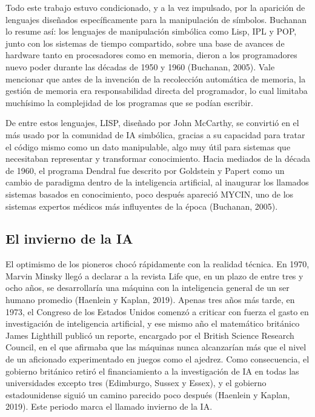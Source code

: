 \documentclass[12pt,letterpaper]{article}
\begin{document}
Todo este trabajo estuvo condicionado, y a la vez impulsado, por la aparici\'on de lenguajes dise\~nados espec\'ificamente para la manipulaci\'on de s\'imbolos. Buchanan lo resume as\'i: los lenguajes de manipulaci\'on simb\'olica como Lisp, IPL y POP, junto con los sistemas de tiempo compartido, sobre una base de avances de hardware tanto en procesadores como en memoria, dieron a los programadores nuevo poder durante las d\'ecadas de 1950 y 1960 (Buchanan, 2005). Vale mencionar que antes de la invenci\'on de la recolecci\'on autom\'atica de memoria, la gesti\'on de memoria era responsabilidad directa del programador, lo cual limitaba much\'isimo la complejidad de los programas que se pod\'ian escribir.

De entre estos lenguajes, LISP, dise\~nado por John McCarthy, se convirti\'o en el m\'as usado por la comunidad de IA simb\'olica, gracias a su capacidad para tratar el c\'odigo mismo como un dato manipulable, algo muy \'util para sistemas que necesitaban representar y transformar conocimiento. Hacia mediados de la d\'ecada de 1960, el programa Dendral fue descrito por Goldstein y Papert como un cambio de paradigma dentro de la inteligencia artificial, al inaugurar los llamados sistemas basados en conocimiento, poco despu\'es apareci\'o MYCIN, uno de los sistemas expertos m\'edicos m\'as influyentes de la \'epoca (Buchanan, 2005).

\subsection{El invierno de la IA}

El optimismo de los pioneros choc\'o r\'apidamente con la realidad t\'ecnica. En 1970, Marvin Minsky lleg\'o a declarar a la revista Life que, en un plazo de entre tres y ocho a\~nos, se desarrollar\'ia una m\'aquina con la inteligencia general de un ser humano promedio (Haenlein y Kaplan, 2019). Apenas tres a\~nos m\'as tarde, en 1973, el Congreso de los Estados Unidos comenz\'o a criticar con fuerza el gasto en investigaci\'on de inteligencia artificial, y ese mismo a\~no el matem\'atico brit\'anico James Lighthill public\'o un reporte, encargado por el British Science Research Council, en el que afirmaba que las m\'aquinas nunca alcanzar\'ian m\'as que el nivel de un aficionado experimentado en juegos como el ajedrez. Como consecuencia, el gobierno brit\'anico retir\'o el financiamiento a la investigaci\'on de IA en todas las universidades excepto tres (Edimburgo, Sussex y Essex), y el gobierno estadounidense sigui\'o un camino parecido poco despu\'es (Haenlein y Kaplan, 2019). Este periodo marca el llamado invierno de la IA.
\end{document}
